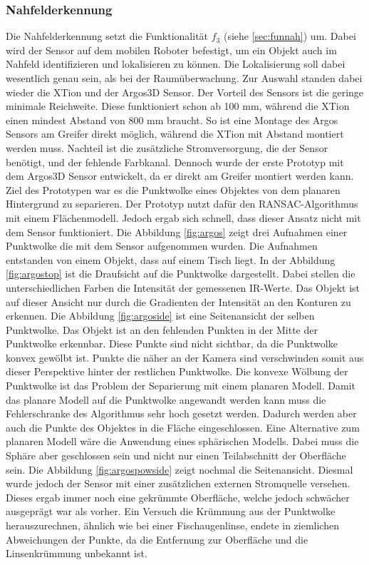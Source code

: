 \subsubsection{Nahfelderkennung}
Die Nahfelderkennung setzt die Funktionalität $f_3$ (siehe \ref{sec:funnah}) um. Dabei wird der Sensor auf dem mobilen Roboter befestigt, um ein Objekt auch im Nahfeld identifizieren und lokalisieren zu können. Die Lokalisierung soll dabei wesentlich genau sein, als bei der Raumüberwachung. Zur Auswahl standen dabei wieder die XTion und der Argos3D Sensor. Der Vorteil des Sensors ist die geringe minimale Reichweite. Diese funktioniert schon ab 100 mm, während die XTion einen mindest Abstand von 800 mm braucht. So ist eine Montage des Argos Sensors am Greifer direkt möglich, während die XTion mit Abstand montiert werden muss. Nachteil ist die zusätzliche Stromversorgung, die der Sensor benötigt, und der fehlende Farbkanal. Dennoch wurde der erste Prototyp mit dem Argos3D Sensor entwickelt, da er direkt am Greifer montiert werden kann. Ziel des Prototypen war es die Punktwolke eines Objektes von dem planaren Hintergrund zu separieren. Der Prototyp nutzt dafür den RANSAC-Algorithmus mit einem Flächenmodell. Jedoch ergab sich schnell, dass dieser Ansatz nicht mit dem Sensor funktioniert. Die Abbildung \ref{fig:argos} zeigt drei Aufnahmen einer Punktwolke die mit dem Sensor aufgenommen wurden. Die Aufnahmen entstanden von einem Objekt, dass auf einem Tisch liegt. In der Abbildung \ref{fig:argostop} ist die Draufsicht auf die Punktwolke dargestellt. Dabei stellen die unterschiedlichen Farben die Intensität der gemessenen IR-Werte. Das Objekt ist auf dieser Ansicht nur durch die Gradienten der Intensität an den Konturen zu erkennen. Die Abbildung \ref{fig:argoside} ist eine Seitenansicht der selben Punktwolke. Das Objekt ist an den fehlenden Punkten in der Mitte der Punktwolke erkennbar. Diese Punkte sind nicht sichtbar, da die Punktwolke konvex gewölbt ist. Punkte die näher an der Kamera sind verschwinden somit aus dieser Perspektive hinter der restlichen Punktwolke. Die konvexe Wölbung der Punktwolke ist das Problem der Separierung mit einem planaren Modell. Damit das planare Modell auf die Punktwolke angewandt werden kann muss die Fehlerschranke des Algorithmus sehr hoch gesetzt werden. Dadurch werden aber auch die Punkte des Objektes in die Fläche eingeschlossen. Eine Alternative zum planaren Modell wäre die Anwendung eines sphärischen Modells. Dabei muss die Sphäre aber geschlossen sein und nicht nur einen Teilabschnitt der Oberfläche sein.  Die Abbildung \ref{fig:argospowside} zeigt nochmal die Seitenansicht. Diesmal wurde jedoch der Sensor mit einer zusätzlichen externen Stromquelle versehen. Dieses ergab immer noch eine gekrümmte Oberfläche, welche jedoch schwächer ausgeprägt war als vorher. Ein Versuch die Krümmung aus der Punktwolke herauszurechnen, ähnlich wie bei einer Fischaugenlinse, endete in ziemlichen Abweichungen der Punkte, da die Entfernung zur Oberfläche und die Linsenkrümmung unbekannt ist.

